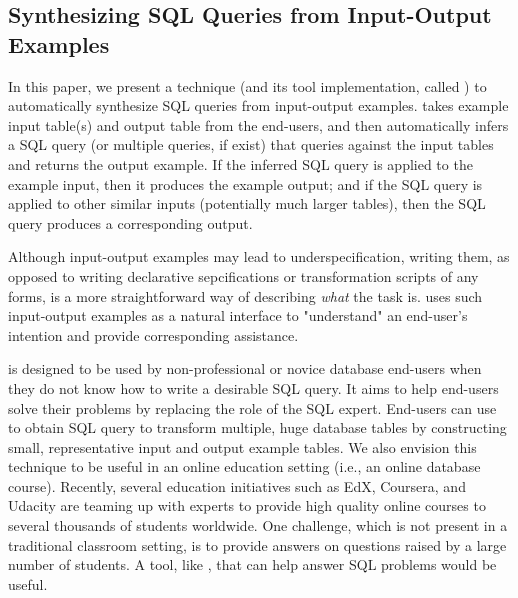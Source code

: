\subsection{Synthesizing SQL Queries from Input-Output Examples}


In this paper, we present a technique (and its tool
implementation, called \ourtool) to automatically synthesize SQL queries
from input-output examples. \ourtool takes example input
table(s) and output table from the end-users, and then automatically
infers a SQL query (or multiple queries, if exist) that queries
against the input tables and returns the output example. If the inferred
SQL query is applied
to the example input, then it produces the example output; and if the
SQL query is applied to other similar inputs (potentially much larger tables),
then the SQL query produces a corresponding output.


Although input-output examples may lead to
underspecification, writing them, as opposed to writing
declarative sepcifications or transformation scripts of any forms,
is a more straightforward way of describing \textit{what} the
task is. \ourtool uses such input-output examples
as a natural interface to "understand" an end-user's intention
and provide corresponding assistance.


\ourtool is designed to be used by non-professional or novice database
end-users when they do not know how
to write a desirable SQL query. It aims to help end-users
solve their problems by replacing the role of the SQL expert.
End-users can use \ourtool to obtain SQL query to transform
multiple, huge database tables by constructing small, representative
input and output example tables. 
We also envision this technique to be useful in an online education
setting (i.e., an online database course). Recently, several
education initiatives such as EdX, Coursera,
and Udacity are teaming up with experts to provide
high quality online courses
to several thousands of students worldwide.
One challenge, which is not present in a traditional classroom
setting, is to provide answers on questions raised by a large
number of students. A tool, like \ourtool,
that can help answer SQL problems would be useful.


